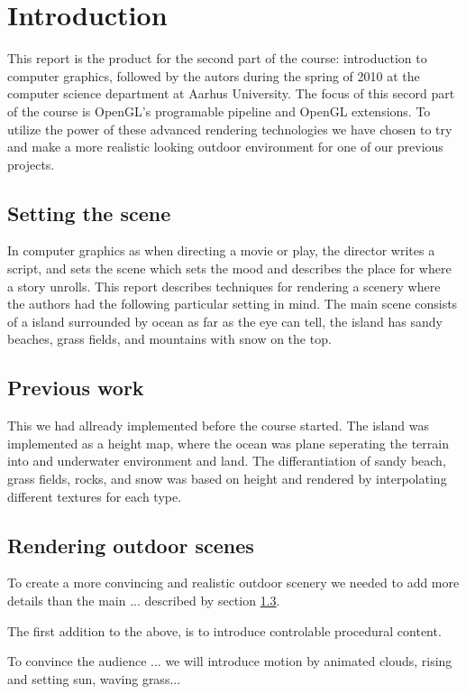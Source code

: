 
\chapter{Introduction}
This report is the product for the second part of the course:
introduction to computer graphics, followed by the autors during the
spring of 2010 at the computer science department at Aarhus University.
The focus of this secord part of the course is OpenGL's programable
pipeline and OpenGL extensions.
%
To utilize the power of these advanced rendering technologies we have
chosen to try and make a more realistic looking outdoor environment
for one of our previous projects.

\section{Setting the scene}
In computer graphics as when directing a movie or play, the director
writes a script, and sets the scene which sets the mood and describes
the place for where a story unrolls.
%
This report describes techniques for rendering a scenery 
where the authors had the following particular setting in mind.
%
The main scene consists of a island surrounded by ocean as far as the
eye can tell, the island has sandy beaches, grass fields, and mountains
with snow on the top.

\section{Previous work}
This we had allready implemented before the course started. The island
was implemented as a height map, where the ocean was plane seperating
the terrain into and underwater environment and land. The
differantiation of sandy beach, grass fields, rocks, and snow was
based on height and rendered by interpolating different textures for
each type.

\section{Rendering outdoor scenes}
To create a more convincing and realistic outdoor scenery we needed to
add more details than the main ... described by section \ref{}.

The first addition to the above, is to introduce controlable
procedural content.

To convince the audience ... we will introduce motion by animated
clouds, rising and setting sun, waving grass...


